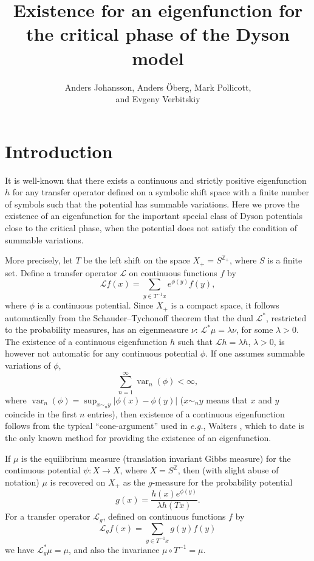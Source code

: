 \documentclass[11pt, a4paper, oneside]{scrartcl}
\title{Existence for an eigenfunction for the critical phase of the Dyson model}
\author{Anders Johansson, Anders \"Oberg, Mark Pollicott, \\ and Evgeny Verbitskiy}
\date{}
\theoremstyle{definition}
\theoremstyle{remark}
\providecommand{\opn}{\operatorname}
\providecommand{\var}{\opn{var}}
\begin{document}
\maketitle

\def\h{h}


\section{Introduction}\noindent

It is well-known that there exists a continuous and strictly positive
eigenfunction $h$ for any transfer operator defined on a symbolic shift space
with a finite number of symbols such that the potential has summable variations.
Here we prove the existence of an eigenfunction for the important special class
of Dyson potentials close to the critical phase, when the potential does not
satisfy the condition of summable variations.

More precisely, let $T$ be the left shift on the space $X_+=S^{{\mathbb Z}_+}$,
where $S$ is a finite set. Define a transfer operator ${\mathcal L}$ on
continuous functions $f$ by
\begin{equation}\label{trans} {\mathcal L} f(x)= \sum_{y\in T^{-1}x}
  e^{\phi(y)}f(y),
\end{equation}
where $\phi$ is a continuous potential. Since $X_+$ is a compact space, it
follows automatically from the Schauder--Tychonoff theorem that the dual
${\mathcal L}^*$, restricted to the probability measures, has an eigenmeasure
$\nu$: ${\mathcal L}^* \mu=\lambda \nu$, for some $\lambda>0$. The existence of
a continuous eigenfunction $h$ such that ${\mathcal L}h=\lambda h$, $\lambda>0$,
is however not automatic for any continuous potential $\phi$. If one assumes
summable variations of $\phi$,
\begin{equation}\label{sum}
  \sum_{n=1}^\infty \var_n (\phi)<\infty,
\end{equation}
where $\var_n(\phi)=\sup_{x\sim_n y}|\phi(x)-\phi(y)|$ ($x\sim_n y$ means that
$x$ and $y$ coincide in the first $n$ entries), then existence of a continuous
eigenfunction follows from the typical ``cone-argument'' used in {\em e.g.},
Walters \cite{waltersConvergenceRuelleOperator2001}, which to date is the only
known method for providing the existence of an eigenfunction.

If $\mu$ is the equilibrium measure (translation invariant Gibbs measure) for
the continuous potential $\psi:X\to X$, where $X=S^{\mathbb Z}$, then (with
slight abuse of notation) $\mu$ is recovered on $X_+$ as the $g$-measure for the
probability potential
\begin{equation}\label{g}
  g(x)= \frac{h(x) e^{\phi(y)}}{\lambda h(Tx)}.
\end{equation}
For a transfer operator ${\mathcal L}_g$, defined on continuous functions $f$ by
\begin{equation} {\mathcal L}_g f(x)=\sum_{y\in T^{-1}x} g(y) f(y)
\end{equation}
we have ${\mathcal L}_g^*\mu=\mu$, and also the invariance $\mu\circ
T^{-1}=\mu$.
\end{document}
